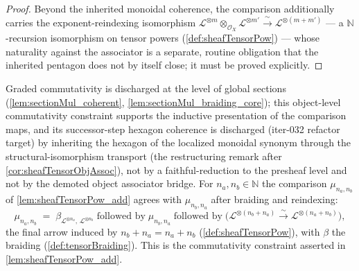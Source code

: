 \begin{proof}
  Beyond the inherited monoidal coherence, the comparison additionally carries the
  exponent-reindexing isomorphism \(\mathcal{L}^{\otimes m} \otimes_{\mathcal{O}_X}
  \mathcal{L}^{\otimes m'} \xrightarrow{\ \sim\ } \mathcal{L}^{\otimes (m+m')}\) ---
  a \(\mathbb{N}\)-recursion isomorphism on tensor powers
  (\cref{def:sheafTensorPow}) --- whose naturality against the associator is a
  separate, routine obligation that the inherited pentagon does not by itself
  close; it must be proved explicitly.
\end{proof}

\begin{lemma}
  \label{lem:tensorPowAdd_braiding}
  Graded commutativity is discharged at the level of global sections
  (\cref{lem:sectionMul_coherent}, \cref{lem:sectionMul_braiding_core}); this
  object-level commutativity constraint supports the inductive presentation of the
  comparison maps, and its successor-step hexagon coherence is discharged (iter-032
  refactor target) by inheriting the hexagon of the localized monoidal synonym
  through the structural-isomorphism transport (the restructuring remark after
  \cref{cor:sheafTensorObjAssoc}), not by a faithful-reduction to the presheaf
  level and not by the demoted object associator bridge.
  For \(n_a, n_b \in \mathbb{N}\) the comparison \(\mu_{n_a,n_b}\) of
  \cref{lem:sheafTensorPow_add} agrees with \(\mu_{n_b,n_a}\) after braiding and
  reindexing:
  \[
    \mu_{n_a,n_b}
      \;=\;
      \beta_{\mathcal{L}^{\otimes n_a},\,\mathcal{L}^{\otimes n_b}}
      \;\textrm{followed by}\;
      \mu_{n_b,n_a}
      \;\textrm{followed by}\;
      \bigl(\mathcal{L}^{\otimes (n_b+n_a)}
        \xrightarrow{\ \sim\ } \mathcal{L}^{\otimes (n_a+n_b)}\bigr),
  \]
  the final arrow induced by \(n_b + n_a = n_a + n_b\)
  (\cref{def:sheafTensorPow}), with \(\beta\) the braiding
  (\cref{def:tensorBraiding}). This is the commutativity constraint asserted in
  \cref{lem:sheafTensorPow_add}.
\end{lemma}

